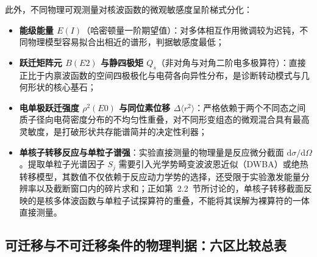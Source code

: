 此外，不同物理可观测量对核波函数的微观敏感度呈阶梯式分化：
\begin{itemize}
\item \textbf{能级能量 $E(I)$}（哈密顿量一阶期望值）：对多体相互作用微调较为迟钝，不同物理模型容易拟合出相近的谱形，判据敏感度最低；
\item \textbf{跃迁矩阵元 $B(E2)$ 与静四极矩 $Q_s$}（非对角与对角二阶电多极算符）：直接正比于内禀波函数的空间四极极化与电荷各向异性分布，是诊断转动模式与几何形状的核心基石；
\item \textbf{电单极跃迁强度 $\rho^2(E0)$ 与同位素位移 $\Delta\langle r^2 \rangle$}：严格依赖于两个不同态之间质子径向电荷密度分布的不均匀性重叠，对不同形变组态的微观混合具有最高灵敏度，是打破形状共存能谱简并的决定性利器；
\item \textbf{单核子转移反应与单粒子谱强}：实验直接测量的物理量是反应微分截面 $\mathrm{d}\sigma/\mathrm{d}\Omega$。提取单粒子光谱因子 $S_j$ 需要引入光学势畸变波波恩近似（DWBA）或绝热转移模型，其数值不仅依赖于反应动力学势的选择，还受限于实验激发能量分辨率以及截断窗口内的碎片求和；正如第~2.2~节所讨论的，单核子转移截面反映的是核多体波函数与单粒子试探算符的重叠，不能将其误解为裸算符的一体直接测量。
\end{itemize}

\subsection{可迁移与不可迁移条件的物理判据：六区比较总表}\label{sec:4-1-5}

